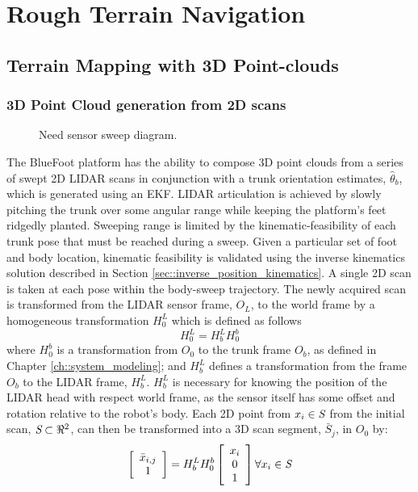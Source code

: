 	\section{Rough Terrain Navigation}

		\subsection{Terrain Mapping with 3D Point-clouds}
			
			\subsubsection{3D Point Cloud generation from 2D scans}
				\begin{figure}[h!]
					\centering
					\caption{Need sensor sweep diagram.}
					\label{fig::sensor_sweep}
				\end{figure}
				The BlueFoot platform has the ability to compose 3D point clouds from a series of swept 2D LIDAR scans in conjunction with a trunk orientation estimates, $\hat{\theta}_{b}$, which is generated using an EKF. LIDAR articulation is achieved by slowly pitching the trunk over some angular range while keeping the platform's feet ridgedly planted. Sweeping range is limited by the kinematic-feasibility of each trunk pose that must be reached during a sweep. Given a particular set of foot and body location, kinematic feasibility is validated using the inverse kinematics solution described in Section \ref{sec::inverse_position_kinematics}. A single 2D scan is taken at each pose within the body-sweep trajectory. The newly acquired scan is transformed from the LIDAR sensor frame, $O_{L}$, to the world frame by a homogeneous transformation $H^{L}_{0}$ which is defined as follows
					\begin{equation}
						H^{L}_{0} = H^{L}_{b} H^{b}_{0}
						\label{eq::world_to_sensor}
					\end{equation}
				where $H^{b}_{0}$ is a transformation from $O_{0}$ to the trunk frame $O_{b}$, as defined in Chapter \ref{ch::system_modeling}; and $H^{L}_{b}$ defines a transformation from the frame $O_{b}$ to the LIDAR frame, $H^{L}_{b}$. $H^{L}_{b}$ is necessary for knowing the position of the LIDAR head with respect world frame, as the sensor itself has some offset and rotation relative to the robot's body. Each 2D point from $x_{i} \in \emph{S}$ from the initial scan, $\emph{S}\subset \Re^{2}$, can then be transformed into a 3D scan segment, $\bar{S}_{j}$, in $O_{0}$ by:
					\begin{equation}
						\left[
							\begin{array}{c}
								\bar{x}_{i,j} \\ 1
							\end{array}
						\right]
					 = H^{L}_{b} H^{b}_{0}	
						\left[
							\begin{array}{c}
								x_{i} \\ 0 \\ 1
							\end{array}
						\right] \forall x_{i} \in \emph{S}
						\label{eq::scan_to_segment}
					\end{equation}
